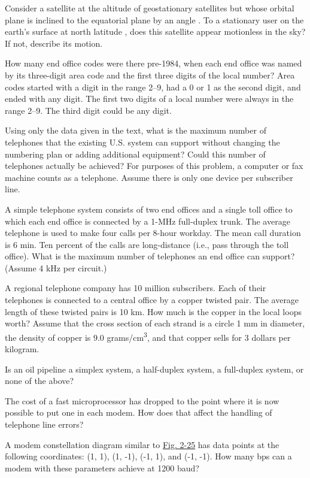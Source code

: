 Consider a satellite at the altitude of geostationary satellites but
whose orbital plane is inclined to the equatorial plane by an angle
. To a stationary user on the earth's surface
at north latitude
, does this satellite
appear motionless in the sky? If not, describe its motion.

How many end office codes were there pre-1984, when each end office was
named by its three-digit area code and the first three digits of the
local number? Area codes started with a digit in the range 2--9, had a 0
or 1 as the second digit, and ended with any digit. The first two digits
of a local number were always in the range 2--9. The third digit could
be any digit.

Using {only} the data given in the text, what is the maximum number of
telephones that the existing U.S. system can support without changing
the numbering plan or adding additional equipment? Could this number of
telephones actually be achieved? For purposes of this problem, a
computer or fax machine counts as a telephone. Assume there is only one
device per subscriber line.

A simple telephone system consists of two end offices and a single toll
office to which each end office is connected by a 1-MHz full-duplex
trunk. The average telephone is used to make four calls per 8-hour
workday. The mean call duration is 6 min. Ten percent of the calls are
long-distance (i.e., pass through the toll office). What is the maximum
number of telephones an end office can support? (Assume 4 kHz per
circuit.)

A regional telephone company has 10 million subscribers. Each of their
telephones is connected to a central office by a copper twisted pair.
The average length of these twisted pairs is 10 km. How much is the
copper in the local loops worth? Assume that the cross section of each
strand is a circle 1 mm in diameter, the density of copper is 9.0
grams/cm\textsuperscript{3}, and that copper sells for 3 dollars per
kilogram.

Is an oil pipeline a simplex system, a half-duplex system, a full-duplex
system, or none of the above?

The cost of a fast microprocessor has dropped to the point where it is
now possible to put one in each modem. How does that affect the handling
of telephone line errors?

A modem constellation diagram similar to
\protect\hyperlink{0130661023_ch02lev1sec5.htmlux5cux23ch02fig25}{Fig.
2-25} has data points at the following coordinates: (1, 1), (1, -1),
(-1, 1), and (-1, -1). How many bps can a modem with these parameters
achieve at 1200 baud?

